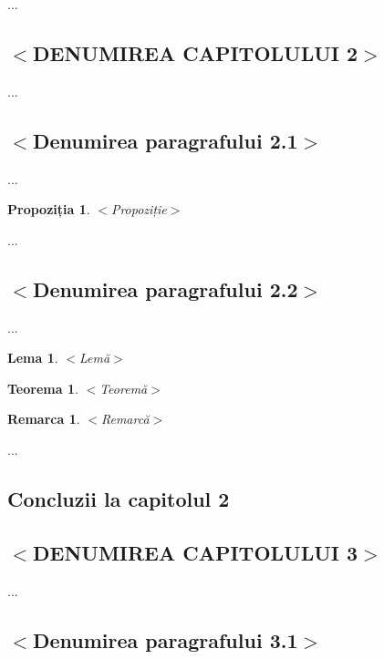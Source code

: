 \documentclass[a4paper, 12pt]{report}
\newtheorem{rmk}[dfn]{Remarca}
\newtheorem{teo}[dfn]{Teorema}
\newtheorem{lem}[dfn]{Lema}
\newtheorem{prop}[dfn]{Propoziția}
\begin{document}
...

\newpage

\begin{center}
\section[\bf $<$DENUMIREA CAPITOLULUI 2$>$]{\bf $<$DENUMIREA CAPITOLULUI 2$>$}
\end{center}

...

\strut
\subsection{$<$Denumirea paragrafului 2.1$>$}

...

\begin{prop}$<$Propoziție$>$
\end{prop}

...

\strut
\subsection{$<$Denumirea paragrafului 2.2$>$}

...

\begin{lem}$<$Lemă$>$
\end{lem}

\begin{teo}$<$Teoremă$>$
\end{teo}

\begin{rmk}$<$Remarcă$>$
\end{rmk}

...

\subsection{Concluzii la capitolul 2}

\newpage

\begin{center}
\section[\bf $<$DENUMIREA CAPITOLULUI 3$>$]{\bf $<$DENUMIREA CAPITOLULUI 3$>$}
\end{center}

...

\strut
\subsection{$<$Denumirea paragrafului 3.1$>$}
\end{document}
